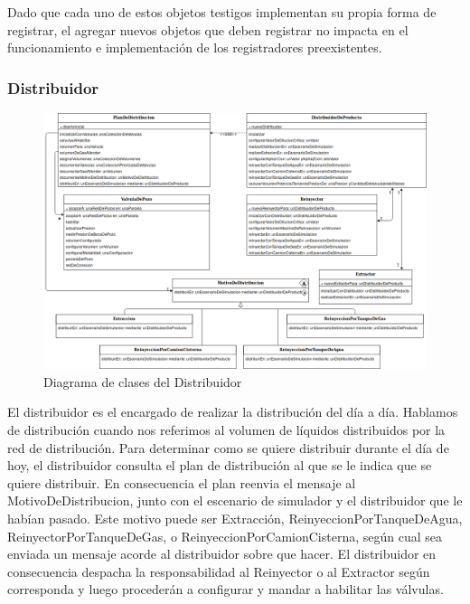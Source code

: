 \documentclass[10pt,a4paper]{article}
\begin{document}
  Dado que cada uno de estos objetos testigos implementan su propia forma de registrar, el agregar nuevos objetos que deben registrar no impacta en el funcionamiento e implementación de los registradores preexistentes.

\pagebreak

\subsubsection{Distribuidor}

\begin{figure}[H]
\centerline{\includegraphics[scale=0.44]{images/DiagramaDeClases_deDistribuidor.png}}
\caption{Diagrama de clases del Distribuidor}
\end{figure}

El distribuidor es el encargado de realizar la distribución del día a día. Hablamos de distribución cuando nos referimos al volumen de líquidos distribuidos por la red de distribución. Para determinar como se quiere distribuir durante el día de hoy, el distribuidor consulta el plan de distribución al que se le indica que se quiere distribuir. En consecuencia el plan reenvia el mensaje al MotivoDeDistribucion, junto con el escenario de simulador y el distribuidor que le habían pasado. Este motivo puede ser Extracción, ReinyeccionPorTanqueDeAgua, ReinyectorPorTanqueDeGas, o ReinyeccionPorCamionCisterna, según cual sea enviada un mensaje acorde al distribuidor sobre que hacer. El distribuidor en consecuencia despacha la responsabilidad al Reinyector o al Extractor según corresponda y luego procederán a configurar y mandar a habilitar las válvulas.

\pagebreak
\end{document}
